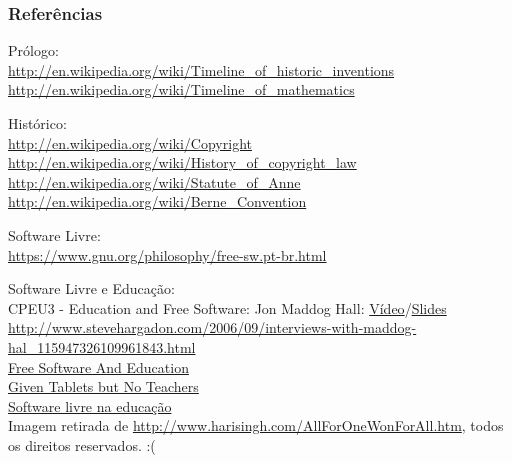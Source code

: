 \documentclass[serif,mathserif]{beamer}
\begin{document}
\begin{frame}
  \frametitle{Referências}
  \small
  Prólogo:\\
  \vspace{2mm}
  \url{http://en.wikipedia.org/wiki/Timeline_of_historic_inventions}
  \url{http://en.wikipedia.org/wiki/Timeline_of_mathematics}\\
  \vspace{2mm}

  Histórico:\\
  \vspace{2mm}
  \url{http://en.wikipedia.org/wiki/Copyright}
  \url{http://en.wikipedia.org/wiki/History_of_copyright_law}
  \url{http://en.wikipedia.org/wiki/Statute_of_Anne}
  \url{http://en.wikipedia.org/wiki/Berne_Convention}\\
  \vspace{2mm}

  Software Livre:\\
  \vspace{2mm}
  \url{https://www.gnu.org/philosophy/free-sw.pt-br.html}

\end{frame}
\begin{frame}

  Software Livre e Educação:\\
  \vspace{2mm}
  {\footnotesize CPEU3 - Education and Free Software: Jon Maddog Hall:} \href{https://www.youtube.com/watch?v=SOxB1IaozCA}{Vídeo}/\href{https://www.cs.helsinki.fi/linux15vuotta/hall.pdf}{Slides}\\
  \url{http://www.stevehargadon.com/2006/09/interviews-with-maddog-hal_115947326109961843.html}\\
  \href{https://www.youtube.com/watch?v=pfty3d4NnEw}{Free Software And Education}\\
  \href{http://www.technologyreview.com/news/506466/given-tablets-but-no-teachers-ethiopian-children-teach-themselves/}{Given Tablets but No Teachers}\\
  \href{https://www.youtube.com/watch?v=gTKIGo151MQ}{Software livre na educação}\\
  Imagem retirada de \url{http://www.harisingh.com/AllForOneWonForAll.htm}, todos os direitos reservados. :(
\end{frame}
\end{document}

